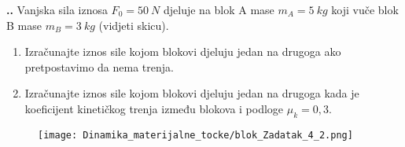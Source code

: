 
\noindent 
\textbf{
\thecjelina.\thezadatak.}
Vanjska sila iznosa $F_0=50\ N$ djeluje na blok A mase $m_A= 5\ kg$ koji vuče blok B mase $m_B= 3\ kg$ (vidjeti skicu). 
\begin{enumerate}[label=\alph*)]
 \item Izračunajte iznos sile kojom blokovi djeluju jedan na drugoga ako pretpostavimo da nema trenja.
 \item Izračunajte iznos sile kojom blokovi djeluju jedan na drugoga kada je koeficijent kinetičkog trenja između blokova i podloge $\mu_k =0,3$.
\end{enumerate}


\begin{figure}[h]%
  \begin{center}
    \texttt{[image: Dinamika\_materijalne\_tocke/blok\_Zadatak\_4\_2.png]}
  \end{center}
\end{figure}


